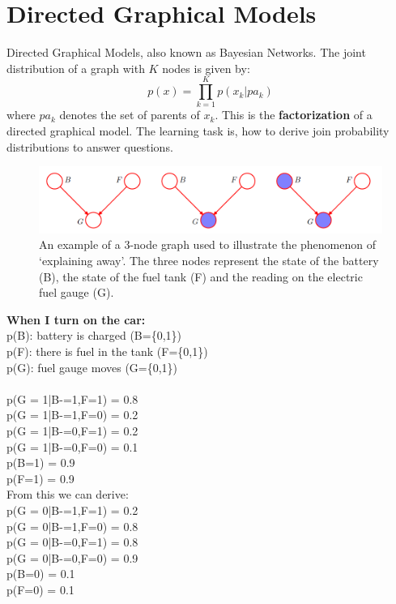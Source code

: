 \section{Directed Graphical Models}
Directed Graphical Models, also known as Bayesian Networks. The joint distribution of a graph with $K$ nodes is given by:
\begin{equation}
    p(x) = \prod_{k=1}^K p(x_k|pa_k)
\end{equation}
where $pa_k$ denotes the set of parents of $x_k$. This is the \textbf{factorization} of a directed graphical model. The learning task is, how to derive join probability distributions to answer questions.

\begin{figure}[tb]
 \centering 
\includegraphics[scale=0.42]{images/DGM.png} 
 \caption{An example of a 3-node graph used to illustrate the phenomenon of ‘explaining away’. The three
nodes represent the state of the battery (B), the state of the fuel tank (F) and the reading on the electric fuel
gauge (G).}
 \label{fig:GDM}
\end{figure}
\textbf{When I turn on the car:} \\
p(B): battery is charged (B=\{0,1\})\\
p(F): there is fuel in the tank (F=\{0,1\})\\
p(G): fuel gauge moves (G=\{0,1\})\\
\\
p(G = 1|B-=1,F=1) = 0.8 \\
p(G = 1|B-=1,F=0) = 0.2 \\
p(G = 1|B-=0,F=1) = 0.2 \\
p(G = 1|B-=0,F=0) = 0.1 \\
p(B=1) = 0.9 \\
p(F=1) = 0.9 \\
From this we can derive: \\
p(G = 0|B-=1,F=1) = 0.2 \\
p(G = 0|B-=1,F=0) = 0.8 \\
p(G = 0|B-=0,F=1) = 0.8 \\
p(G = 0|B-=0,F=0) = 0.9 \\
p(B=0) = 0.1 \\
p(F=0) = 0.1 \\
